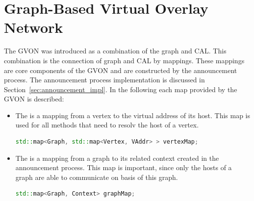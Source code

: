 \section{Graph-Based Virtual Overlay Network}
\label{sec:gvon_impl}
The GVON was introduced as a combination
of the graph and CAL. This combination is the connection of graph and CAL
by mappings. These mappings are core components of the GVON and are
constructed by the announcement process. The announcement process
implementation is discussed in Section~\ref{sec:announcement_impl}. In
the following each map provided by the GVON is described:

\begin{itemize}
\item [] The  is a mapping from a vertex to the virtual
address of its host.  This map is used for all methods
that need to resolv the host of a vertex.

\begin{lstlisting}[language=C++, label=lst:mapping1]
std::map<Graph, std::map<Vertex, VAddr> > vertexMap;
\end{lstlisting}


\item [] The  is a mapping from a graph to its related
context created in the announcement process.  This map is important,
since only the hosts of a graph are able to communicate on basis of
this graph.

\begin{lstlisting}[language=C++, label=lst:mapping2]
std::map<Graph, Context> graphMap;
\end{lstlisting}

\end{itemize}

